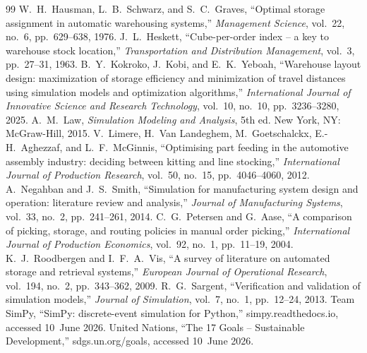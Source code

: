 \documentclass[conference]{IEEEtran}
\begin{document}
\begin{thebibliography}{99}
 W.~H.~Hausman, L.~B.~Schwarz, and S.~C.~Graves, ``Optimal storage assignment in automatic warehousing systems,'' \textit{Management Science}, vol.~22, no.~6, pp.~629--638, 1976.
 J.~L.~Heskett, ``Cube-per-order index -- a key to warehouse stock location,'' \textit{Transportation and Distribution Management}, vol.~3, pp.~27--31, 1963.
 B.~Y.~Kokroko, J.~Kobi, and E.~K.~Yeboah, ``Warehouse layout design: maximization of storage efficiency and minimization of travel distances using simulation models and optimization algorithms,'' \textit{International Journal of Innovative Science and Research Technology}, vol.~10, no.~10, pp.~3236--3280, 2025.
 A.~M.~Law, \textit{Simulation Modeling and Analysis}, 5th ed. New York, NY: McGraw-Hill, 2015.
 V.~Limere, H.~Van Landeghem, M.~Goetschalckx, E.-H.~Aghezzaf, and L.~F.~McGinnis, ``Optimising part feeding in the automotive assembly industry: deciding between kitting and line stocking,'' \textit{International Journal of Production Research}, vol.~50, no.~15, pp.~4046--4060, 2012.
 A.~Negahban and J.~S.~Smith, ``Simulation for manufacturing system design and operation: literature review and analysis,'' \textit{Journal of Manufacturing Systems}, vol.~33, no.~2, pp.~241--261, 2014.
 C.~G.~Petersen and G.~Aase, ``A comparison of picking, storage, and routing policies in manual order picking,'' \textit{International Journal of Production Economics}, vol.~92, no.~1, pp.~11--19, 2004.
 K.~J.~Roodbergen and I.~F.~A.~Vis, ``A survey of literature on automated storage and retrieval systems,'' \textit{European Journal of Operational Research}, vol.~194, no.~2, pp.~343--362, 2009.
 R.~G.~Sargent, ``Verification and validation of simulation models,'' \textit{Journal of Simulation}, vol.~7, no.~1, pp.~12--24, 2013.
 Team SimPy, ``SimPy: discrete-event simulation for Python,'' simpy.readthedocs.io, accessed 10~June 2026.
 United Nations, ``The 17 Goals -- Sustainable Development,'' sdgs.un.org/goals, accessed 10~June 2026.
\end{thebibliography}

\appendix
\end{document}
